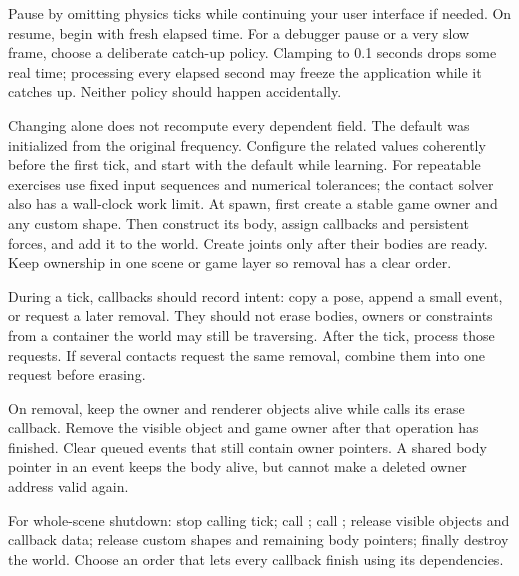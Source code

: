 \documentclass[11pt,a4paper]{article}
\begin{document}
Pause by omitting physics ticks while continuing your user interface if needed. On resume, begin with fresh elapsed time. For a debugger pause or a very slow frame, choose a deliberate catch-up policy. Clamping to 0.1 seconds drops some real time; processing every elapsed second may freeze the application while it catches up. Neither policy should happen accidentally.

Changing  alone does not recompute every dependent field. The default  was initialized from the original frequency. Configure the related values coherently before the first tick, and start with the default while learning. For repeatable exercises use fixed input sequences and numerical tolerances; the contact solver also has a wall-clock work limit.
At spawn, first create a stable game owner and any custom shape. Then construct its body, assign callbacks and persistent forces, and add it to the world. Create joints only after their bodies are ready. Keep ownership in one scene or game layer so removal has a clear order.

During a tick, callbacks should record intent: copy a pose, append a small event, or request a later removal. They should not erase bodies, owners or constraints from a container the world may still be traversing. After the tick, process those requests. If several contacts request the same removal, combine them into one request before erasing.

On removal, keep the owner and renderer objects alive while  calls its erase callback. Remove the visible object and game owner after that operation has finished. Clear queued events that still contain owner pointers. A shared body pointer in an event keeps the body alive, but cannot make a deleted owner address valid again.

For whole-scene shutdown: stop calling tick; call ; call ; release visible objects and callback data; release custom shapes and remaining body pointers; finally destroy the world. Choose an order that lets every callback finish using its dependencies.
\end{document}
